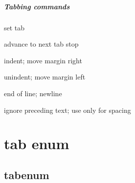 \documentclass[12pt, a4paper, oneside]{book}
\let\stdsection\section
\renewcommand\section{\newpage\stdsection}
\begin{document}
		\paragraph{Tabbing commands}
		\begin{description}[itemsep=-0.5em,style=sameline]
		\item [\textbackslash =] set tab
		\item [\textbackslash $>$] advance to next tab stop
		\item [\textbackslash $<$]
		\item [\textbackslash $+$] indent; move margin right
		\item [\textbackslash $-$] unindent; move margin left
		\item [\textbackslash ']
		\item [\textbackslash `]
		\item [\textbackslash \textbackslash] end of line; newline
		\item [\textbackslash kill] ignore preceding text; use only for spacing
		\end{description}




	\chapter{tab enum}


\section{tabenum}
\end{document}
